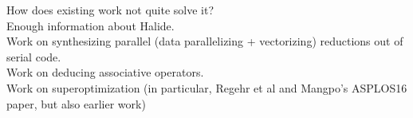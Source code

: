 How does existing work not quite solve it? \\
Enough information about Halide. \\
Work on synthesizing parallel (data parallelizing + vectorizing) reductions out of serial code. \\
Work on deducing associative operators. \\
Work on superoptimization (in particular, Regehr et al and Mangpo's ASPLOS16 paper, but also earlier work)

